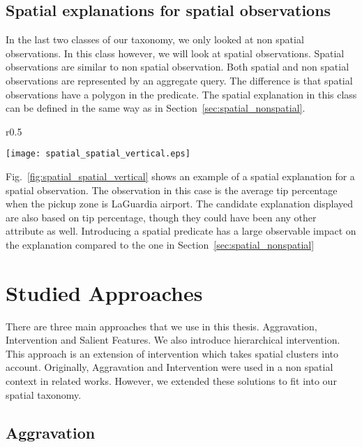 \subsection{Spatial explanations for spatial observations}
\label{sec:spatial_spatial}
In the last two classes of our taxonomy, we only looked at non spatial observations. In this class however, we will look at spatial observations. Spatial observations are similar to non spatial observation. Both spatial and non spatial observations are represented by an aggregate query. The difference is that spatial observations have a polygon in the predicate. The spatial explanation in this class can be defined in the same way as in Section~\ref{sec:spatial_nonspatial}. 

\begin{wrapfigure}{r}{0.5\textwidth}
  \begin{center}
    \texttt{[image: spatial\_spatial\_vertical.eps]}
  \end{center}
  \caption{An example of spatial explanation for a spatial observation}
\label{fig:spatial_spatial_vertical}
\end{wrapfigure}



Fig.~\ref{fig:spatial_spatial_vertical} shows an example of a spatial explanation for a spatial observation. The observation in this case is the average tip percentage when the pickup zone is LaGuardia airport. The candidate explanation displayed are also based on tip percentage, though they could have been any other attribute as well. Introducing a spatial predicate has a large observable impact on the explanation compared to the one in Section~\ref{sec:spatial_nonspatial}


\section{Studied Approaches}
\label{sec:approaches}
There are three main approaches that we use in this thesis. Aggravation, Intervention and Salient Features. We also introduce hierarchical intervention. This approach is an extension of intervention which takes spatial clusters into account. Originally, Aggravation and Intervention were used in a non spatial context in related works\citep{chirigati2016data}. However, we extended these solutions to fit into our spatial taxonomy. 

\subsection{Aggravation}
\label{sec:aggravation}

